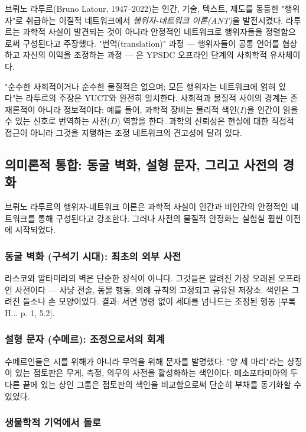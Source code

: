 \documentclass[12pt,a4paper]{article}
\begin{document}
	브뤼노 라투르(Bruno Latour, 1947–2022)는 인간, 기술, 텍스트, 제도를 동등한 "행위자"로 취급하는 이질적 네트워크에서 \emph{행위자-네트워크 이론(ANT)}을 발전시켰다. 라투르는 과학적 사실이 발견되는 것이 아니라 안정적인 네트워크로 행위자들을 정렬함으로써 구성된다고 주장했다. "번역(translation)" 과정 — 행위자들이 공통 언어를 협상하고 자신의 이익을 조정하는 과정 — 은 YPSDC 오프라인 단계의 사회학적 유사체이다.
	
	"순수한 사회적이거나 순수한 물질적은 없으며; 모든 행위자는 네트워크에 얽혀 있다"는 라투르의 주장은 YUCT와 완전히 일치한다. 사회적과 물질적 사이의 경계는 존재론적이 아니라 정보적이다: 예를 들어, 과학적 장비는 물리적 색인(\(I\))을 인간이 읽을 수 있는 신호로 번역하는 사전(\(D\)) 역할을 한다. 과학의 신뢰성은 현실에 대한 직접적 접근이 아니라 그것을 지탱하는 조정 네트워크의 견고성에 달려 있다.
	
	\subsection{의미론적 통합: 동굴 벽화, 설형 문자, 그리고 사전의 경화}
	\label{subsec:semantic-consolidation}
	
	브뤼노 라투르의 행위자-네트워크 이론은 과학적 사실이 인간과 비인간의 안정적인 네트워크를 통해 구성된다고 강조한다. 그러나 사전의 물질적 안정화는 실험실 훨씬 이전에 시작되었다.
	
	\subsubsection{동굴 벽화 (구석기 시대): 최초의 외부 사전}
	
	라스코와 알타미라의 벽은 단순한 장식이 아니다. 그것들은 알려진 가장 오래된 오프라인 사전이다 — 사냥 전술, 동물 행동, 의례 규칙의 고정되고 공유된 저장소. 색인은 그려진 들소나 손 모양이었다. 결과: 서면 명령 없이 세대를 넘나드는 조정된 행동 [부록 H... p. 1, 5.2].
	
	\subsubsection{설형 문자 (수메르): 조정으로서의 회계}
	
	수메르인들은 시를 위해가 아니라 무역을 위해 문자를 발명했다. "양 세 마리"라는 상징이 있는 점토판은 무게, 측정, 의무의 사전을 활성화하는 색인이다. 메소포타미아의 두 다른 끝에 있는 상인 그룹은 점토판의 색인을 비교함으로써 단순히 부채를 동기화할 수 있었다.
	
	\subsubsection{생물학적 기억에서 돌로}
	
\end{document}
